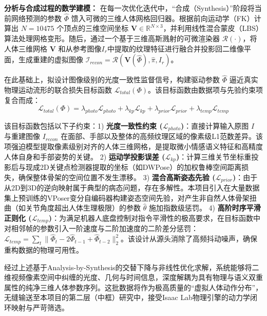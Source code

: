 \textbf{分析与合成过程的数学建模：}
在每一次优化迭代中，“合成（Synthesis）”阶段将当前网络预测的参数 $\hat{\Phi}$ 馈入可微的三维人体网格回归器。根据前向运动学（FK）计算出 $N=10475$ 个顶点的三维空间坐标 $\mathbf{V} \in \mathbb{R}^{N \times 3}$，并利用线性混合蒙皮（LBS）算法处理网格变形。随后，通过一个基于三维高斯溅射的可微渲染器 $\mathcal{R}(\cdot)$，将人体三维网格 $\mathbf{V}$ 和从参考图像$I_{r}$中提取的纹理特征进行融合并投影回二维像平面，生成重建的虚拟图像 $\mathcal{I}_{recon} = \mathcal{R}(\mathbf{V}(\hat{\Phi}), \hat{\pi}, I_{r})$。

在此基础上，拟设计图像级别的光度一致性监督信号，构建驱动参数 $\hat{\Phi}$ 逼近真实物理运动流形的联合损失目标函数 $\mathcal{L}_{total}(\Phi)$。该目标函数由数据项与先验约束项复合而成：
\begin{equation}
\label{eq:optimization}
\mathcal{L}_{total}(\Phi) = \lambda_{photo}\mathcal{L}_{photo} + \lambda_{kp}\mathcal{L}_{kp} + \lambda_{prior}\mathcal{L}_{prior} + \lambda_{temp}\mathcal{L}_{temp}
\end{equation}

该目标函数包括以下子约束：1) \textbf{光度一致性约束 ($\mathcal{L}_{photo}$)}：直接计算输入原图 $I$ 与重建图像 $I_{recon}$ 在面部、手部以及整体的高频纹理区域的像素级L1范数差异。该项强迫模型提取像素级别对齐的人体三维网格，是提取微小情感语义特征和高精度人体自身和手部姿势的关键。
2) \textbf{运动学投影误差 ($\mathcal{L}_{kp}$)}：计算三维关节坐标重投影后与现成2D关键点检测器提取的坐标（如DWPose）的加权鲁棒空间距离损失，确保整体骨架的空间位置不发生漂移。
3) \textbf{混合高斯姿态先验 ($\mathcal{L}_{prior}$)}：由于从2D到3D的逆向映射属于典型的病态问题，存在多解性。本项目引入在大量数据集上预训练的VPoser变分自编码器构建姿态空间先验，对产生非自然人体骨架扭曲（如关节角度超出人体生理极限）的参数 $\hat{\theta}$ 施加指数级惩罚。
4) \textbf{高阶时序平滑正则化 ($\mathcal{L}_{temp}$)}：为满足机器人底盘控制对指令平滑性的极高要求，在目标函数中对相邻帧的参数引入一阶速度与二阶加速度的二阶差分惩罚：$\mathcal{L}_{temp} = \sum_{t} \|\hat{\Phi}_t - 2\hat{\Phi}_{t-1} + \hat{\Phi}_{t-2}\|^2_2$。该设计从源头消除了高频抖动噪声，确保重构数据的物理可用性。

经过上述基于Analysis-by-Synthesis的交替下降与非线性优化求解，系统能够将二维视频像素空间中纠缠的光度、几何与时间信息，深度解耦为具有物理与语义双重属性的纯净三维人体参数序列。这批数据将作为极高质量的“虚拟人体动作分布”，无缝输送至本项目的第二层（中框）研究中，接受Isaac Lab物理引擎的动力学闭环映射与严苛筛选。


